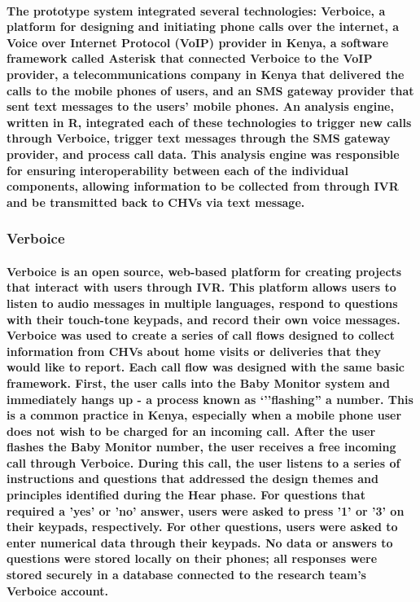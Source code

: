 \paragraph{The prototype system integrated several technologies: Verboice, a platform for designing and initiating phone calls over the internet, a Voice over Internet Protocol (VoIP) provider in Kenya, a software framework called Asterisk that connected Verboice to the VoIP provider, a telecommunications company in Kenya that delivered the calls to the mobile phones of users, and an SMS gateway provider that sent text messages to the users' mobile phones. An analysis engine, written in R, integrated each of these technologies to trigger new calls through Verboice, trigger text messages through the SMS gateway provider, and process call data. This analysis engine was responsible for ensuring interoperability between each of the individual components, allowing information to be collected from through IVR and be transmitted back to CHVs via text message. }

\subsubsection{Verboice}

\paragraph{Verboice is an open source, web-based platform for creating projects that interact with users through IVR. This platform allows users to listen to audio messages in multiple languages, respond to questions with their touch-tone keypads, and record their own voice messages. Verboice was used to create a series of call flows designed to collect information from CHVs about home visits or deliveries that they would like to report. Each call flow was designed with the same basic framework. First, the user calls into the Baby Monitor system and immediately hangs up - a process known as `''flashing'' a number. This is a common practice in Kenya, especially when a mobile phone user does not wish to be charged for an incoming call. After the user flashes the Baby Monitor number, the user receives a free incoming call through Verboice. During this call, the user listens to a series of instructions and questions that addressed the design themes and principles identified during the Hear phase. For questions that required a 'yes' or 'no' answer, users were asked to press '1' or '3' on their keypads, respectively. For other questions, users were asked to enter numerical data through their keypads. No data or answers to questions were stored locally on their phones; all responses were stored securely in a database connected to the research team's Verboice account. }

